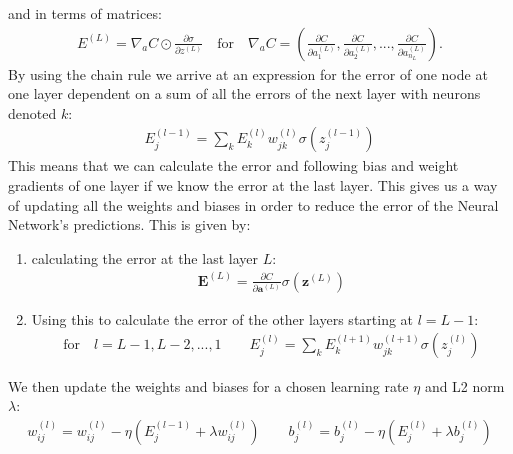 \documentclass[11pt]{article}
\begin{document}
and in terms of matrices:
\begin{align*}
    E^{(L)} = \nabla_a C \odot \frac{\partial \sigma }{\partial z^{(L)}} \quad \text{for} \quad \nabla_a C = \left(\frac{\partial C }{\partial a_1^{(L)}}, \frac{\partial C }{\partial a_2^{(L)}},..., \frac{\partial C }{\partial a_{n_L}^{(L)}}\right).
\end{align*}
By using the chain rule we arrive at an expression for the error of one node at one layer dependent on a sum of all the errors of the next layer with neurons denoted $k$:
\begin{align*}
    E^{(l-1)}_j = \sum_k E^{(l)}_k w_{jk}^{(l)}\sigma(z_j^{(l-1)})
\end{align*}
This means that we can calculate the error and following bias and weight gradients of one layer if we know the error at the last layer. This gives us a way of updating all the weights and biases in order to reduce the error of the Neural Network's predictions. This is given by:
\begin{enumerate}
    \item calculating the error at the last layer $L$:
          \begin{align*}
              \boldsymbol{E}^{(L)} = \frac{\partial C }{\partial \boldsymbol{a}^{(L)}} \sigma(\boldsymbol{z}^{(L)})
          \end{align*}
    \item Using this to calculate the error of the other layers starting at $l=L-1$:
          \begin{align*}
              \text{for}\quad  l=L-1, L-2,...,1 \quad\quad
              E_j^{(l)} = \sum_k E^{(l+1)}_k w_{jk}^{(l+1)} \sigma(z_j^{(l)})
          \end{align*}
\end{enumerate}
We then update the weights and biases for a chosen learning rate $\eta$ and L2 norm $\lambda$:
\begin{align*}
    w^{(l)}_{ij} = w^{(l)}_{ij} - \eta(E_j^{(l-1)}  + \lambda w_{ij}^{(l)}) \quad\quad b_j^{(l)} = b_j^{(l)} - \eta(E_j^{(l)} + \lambda b_j^{(l)})
\end{align*}
\end{document}
